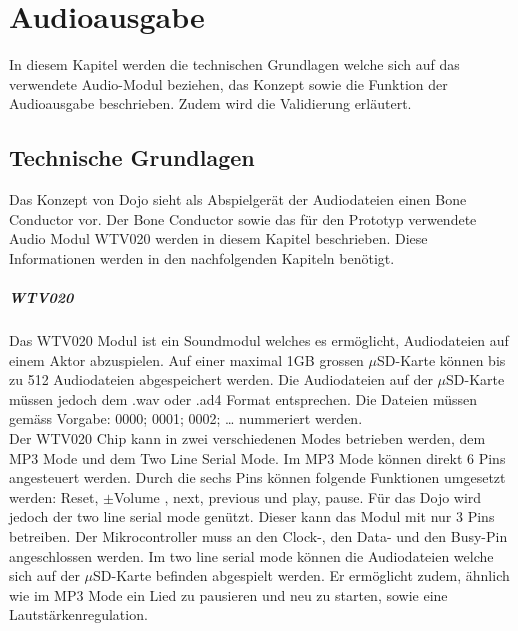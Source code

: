 \chapter{Audioausgabe}
\label{Audioausgabe}
\thispagestyle{fancy}  
In diesem Kapitel werden die technischen Grundlagen welche sich auf das verwendete Audio-Modul beziehen, das Konzept sowie die Funktion der Audioausgabe beschrieben. Zudem wird die Validierung erläutert.
\section{Technische Grundlagen}\label{TechWTV}
Das Konzept von Dojo sieht als Abspielgerät der Audiodateien einen Bone Conductor vor. Der Bone Conductor sowie das für den Prototyp verwendete Audio Modul WTV020 werden in diesem Kapitel beschrieben. Diese Informationen werden in den nachfolgenden Kapiteln benötigt. 
\paragraph{WTV020}
Das WTV020 Modul ist ein Soundmodul welches es ermöglicht, Audiodateien auf einem Aktor abzuspielen. Auf einer maximal 1GB grossen $\mu$SD-Karte können bis zu 512 Audiodateien abgespeichert werden. Die Audiodateien auf der $\mu$SD-Karte müssen jedoch dem .wav oder .ad4 Format entsprechen. Die Dateien müssen gemäss Vorgabe: 0000; 0001; 0002; … nummeriert werden.\\
Der WTV020 Chip kann in zwei verschiedenen Modes betrieben werden, dem MP3 Mode und dem Two Line Serial Mode. Im MP3 Mode können direkt 6 Pins angesteuert werden. Durch die sechs Pins können folgende Funktionen umgesetzt werden: Reset, $\pm$Volume , next, previous und play, pause. 
Für das Dojo wird jedoch der two line serial mode genützt. Dieser kann das Modul mit nur 3 Pins betreiben. Der Mikrocontroller muss an den Clock-, den Data- und den Busy-Pin angeschlossen werden. Im two line serial mode können die Audiodateien welche sich auf der $\mu$SD-Karte befinden abgespielt werden. Er ermöglicht zudem, ähnlich wie im MP3 Mode ein Lied zu pausieren und neu zu starten, sowie eine Lautstärkenregulation. \cite{WTV020}

